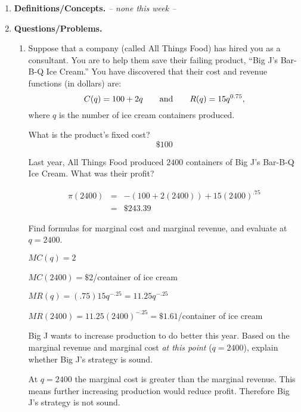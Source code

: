 \documentclass[11pt,letterpaper]{article}
\begin{document}
\begin{enumerate}
\item \textbf{Definitions/Concepts.} \emph{-- none this week --}

\vspace{1pc}
\item \textbf{Questions/Problems.}  

\begin{enumerate}
\item Suppose that a company (called All
Things Food) has hired you as a consultant. You are to
help them
save their failing product, ``Big J's Bar-B-Q Ice
Cream.'' You
have discovered that their cost and revenue functions
(in dollars)
are:
$$C(q)= 100 + 2q \qquad{\rm and}\qquad
R(q)= 15 q^{0.75},$$ where $q$ is the
number of ice cream containers produced. 

\vspace{0.3in}
 What is the product's fixed cost?
\[\$100\]

\vspace{3pc}
 Last year, All Things Food produced
$2400$ containers of Big J's Bar-B-Q Ice Cream. What
was their
profit?

\begin{eqnarray*}
 \pi (2400) &=& -(100+2(2400))+15(2400)^{.75} \\
&=& \$243.39
\end{eqnarray*}

\vspace{0.5pc}
 Find formulas for marginal cost and
marginal revenue, and evaluate at
$q=2400$.

\vspace{.4in}
$MC(q) = 2$

\vspace{0.4in}
$MC(2400) = \$2$/container of ice cream

\vspace{0.4in}
$MR(q) = (.75)15q^{-.25}=11.25q^{-.25}$

\vspace{0.4in}
$MR(2400) = 11.25(2400)^{-.25}=\$ 1.61$/container of ice cream

\vspace{0.4in}
 Big J wants to increase production
to
do better this year. Based on the marginal revenue and
marginal
cost {\it at this point} ($q=2400$), explain whether
Big J's
strategy is sound. 

\vspace{0.5pc}  At $q=2400$ the marginal cost is greater than the marginal revenue.  This means further increasing production would reduce profit.  Therefore Big J's strategy is not sound. 


\end{enumerate}
\end{enumerate}
\end{document}

